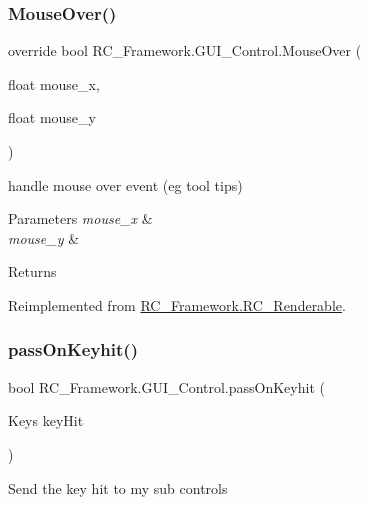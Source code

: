 \subsubsection{\texorpdfstring{Mouse\+Over()}{MouseOver()}}
{\footnotesize\ttfamily override bool R\+C\+\_\+\+Framework.\+G\+U\+I\+\_\+\+Control.\+Mouse\+Over (\begin{DoxyParamCaption}\item[{float}]{mouse\+\_\+x,  }\item[{float}]{mouse\+\_\+y }\end{DoxyParamCaption})\hspace{0.3cm}{\ttfamily [virtual]}}



handle mouse over event (eg tool tips) 


\begin{DoxyParams}{Parameters}
{\em mouse\+\_\+x} & \\
\hline
{\em mouse\+\_\+y} & \\
\hline
\end{DoxyParams}
\begin{DoxyReturn}{Returns}

\end{DoxyReturn}


Reimplemented from \mbox{\hyperlink{class_r_c___framework_1_1_r_c___renderable_abd55ea96d88d7bd2207e3a4ede1f1a05}{R\+C\+\_\+\+Framework.\+R\+C\+\_\+\+Renderable}}.

\mbox{\label{class_r_c___framework_1_1_g_u_i___control_a8e4abd4dc7a2243fc309fb80c984ef9e}} 
\subsubsection{\texorpdfstring{pass\+On\+Keyhit()}{passOnKeyhit()}}
{\footnotesize\ttfamily bool R\+C\+\_\+\+Framework.\+G\+U\+I\+\_\+\+Control.\+pass\+On\+Keyhit (\begin{DoxyParamCaption}\item[{Keys}]{key\+Hit }\end{DoxyParamCaption})}



Send the key hit to my sub controls 


